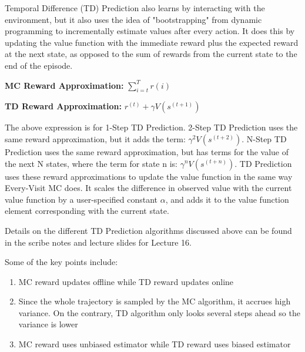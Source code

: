 \documentclass[11pt]{article}
\begin{document}
Temporal Difference (TD) Prediction also learns by interacting with the environment, but it also uses the idea of "bootstrapping" from dynamic programming to incrementally estimate values after every action. It does this by updating the value function with the immediate reward plus the expected reward at the next state, as opposed to the sum of rewards from the current state to the end of the episode. 

\textbf{MC Reward Approximation:} $\sum\limits_{i=t}^T r(i)$

\textbf{TD Reward Approximation:} $r^{(t)} + \gamma V(s^{(t+1)})$

The above expression is for 1-Step TD Prediction. 2-Step TD Prediction uses the same reward approximation, but it adds the term: $\gamma^2 V(s^{(t+2)})$. N-Step TD Prediction uses the same reward approximation, but has terms for the value of the next N states, where the term for state n is: $\gamma^n V(s^{(t+n)})$. TD Prediction uses these reward approximations to update the value function in the same way Every-Visit MC does. It scales the difference in observed value with the current value function by a user-specified constant $\alpha$, and adds it to the value function element corresponding with the current state. 

Details on the different TD Prediction algorithms discussed above can be found in the scribe notes and lecture slides for Lecture 16.

Some of the key points include:
\begin{enumerate}
  \item MC reward updates offline while TD reward updates online
  \item Since the whole trajectory is sampled by the MC algorithm, it accrues high variance. On the contrary, TD algorithm only looks several steps ahead so the variance is lower
  \item MC reward uses unbiased estimator while TD reward uses biased estimator
\end{enumerate}



\end{document}
